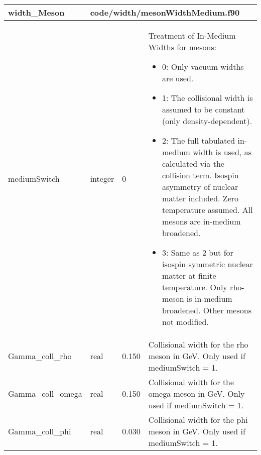 \documentclass{article}
\begin{document}
\begin{longtable}{llll}
\toprule
\textbf{\large{width\_Meson}} & \multicolumn{3}{l}{\footnotesize{code/width/mesonWidthMedium.f90}}\\*
\midrule
\endfirsthead
\midrule
\endhead
mediumSwitch & \begin{minipage}[t]{2cm}integer\end{minipage} & \begin{minipage}[t]{2cm}0\end{minipage} & \begin{minipage}[t]{12cm}Treatment of In-Medium Widths for mesons:\begin{itemize}\leftmargin0em\itemindent0pt\item 0: Only vacuum widths are used.\item 1: The collisional width is assumed to be constant   (only density-dependent).\item 2: The full tabulated in-medium width is used, as calculated via the   collision term. Isospin asymmetry of nuclear matter included.   Zero temperature assumed. All mesons are in-medium broadened.\item 3: Same as 2 but for isospin symmetric nuclear matter at finite   temperature.   Only rho-meson is in-medium broadened. Other mesons not modified.\end{itemize}\end{minipage}\\*
\midrule
Gamma\_coll\_rho & \begin{minipage}[t]{2cm}real\end{minipage} & \begin{minipage}[t]{2cm}0.150\end{minipage} & \begin{minipage}[t]{12cm}Collisional width for the rho meson in GeV. Only used if mediumSwitch = 1.\end{minipage}\\*
\midrule
Gamma\_coll\_omega & \begin{minipage}[t]{2cm}real\end{minipage} & \begin{minipage}[t]{2cm}0.150\end{minipage} & \begin{minipage}[t]{12cm}Collisional width for the omega meson in GeV. Only used if mediumSwitch = 1.\end{minipage}\\*
\midrule
Gamma\_coll\_phi & \begin{minipage}[t]{2cm}real\end{minipage} & \begin{minipage}[t]{2cm}0.030\end{minipage} & \begin{minipage}[t]{12cm}Collisional width for the phi meson in GeV. Only used if mediumSwitch = 1.\end{minipage}\\*

\end{longtable}
\end{document}
